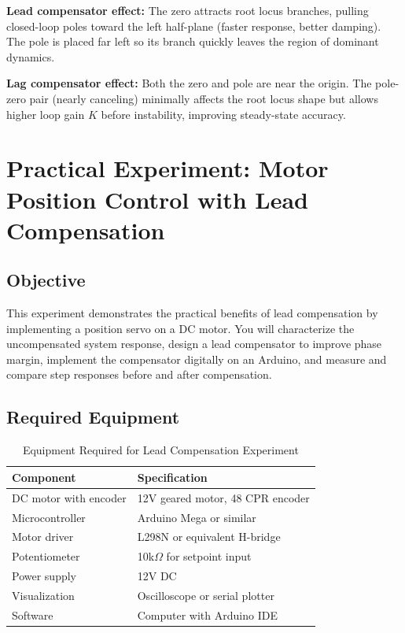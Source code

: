 \textbf{Lead compensator effect:} The zero attracts root locus branches, pulling closed-loop poles toward the left half-plane (faster response, better damping). The pole is placed far left so its branch quickly leaves the region of dominant dynamics.

\textbf{Lag compensator effect:} Both the zero and pole are near the origin. The pole-zero pair (nearly canceling) minimally affects the root locus shape but allows higher loop gain $K$ before instability, improving steady-state accuracy.

\section{Practical Experiment: Motor Position Control with Lead Compensation}
\label{sec:lead_lag_experiment}

\subsection{Objective}

This experiment demonstrates the practical benefits of lead compensation by implementing a position servo on a DC motor. You will characterize the uncompensated system response, design a lead compensator to improve phase margin, implement the compensator digitally on an Arduino, and measure and compare step responses before and after compensation.

\subsection{Required Equipment}

\begin{table}[htbp]
\centering
\caption{Equipment Required for Lead Compensation Experiment}
\begin{tabular}{ll}
\toprule
\textbf{Component} & \textbf{Specification} \\
\midrule
DC motor with encoder & 12V geared motor, 48 CPR encoder \\
Microcontroller & Arduino Mega or similar \\
Motor driver & L298N or equivalent H-bridge \\
Potentiometer & 10k$\Omega$ for setpoint input \\
Power supply & 12V DC \\
Visualization & Oscilloscope or serial plotter \\
Software & Computer with Arduino IDE \\
\bottomrule
\end{tabular}
\end{table}

